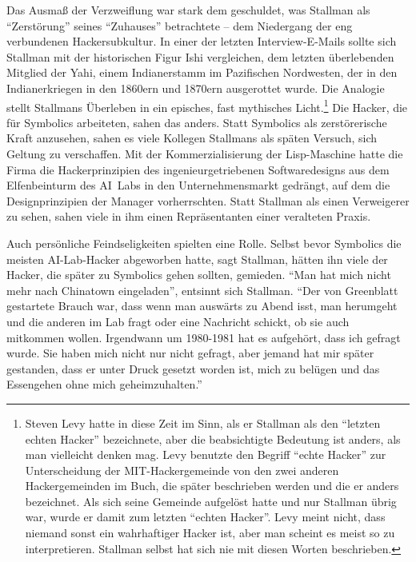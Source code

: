 Das Ausmaß der Verzweiflung war stark dem geschuldet, was Stallman als "`Zerstörung"' seines "`Zuhauses"' betrachtete – dem Niedergang der eng verbundenen Hackersubkultur. In einer der letzten Interview-E-Mails sollte sich Stallman mit der historischen Figur Ishi vergleichen, dem letzten überlebenden Mitglied der Yahi, einem Indianerstamm im Pazifischen Nordwesten, der in den Indianerkriegen in den 1860ern und 1870ern ausgerottet wurde. Die Analogie stellt Stallmans Überleben in ein episches, fast mythisches Licht.\footnote{Steven Levy hatte in  diese Zeit im Sinn, als er Stallman als den "`letzten echten Hacker"' bezeichnete, aber die beabsichtigte Bedeutung ist anders, als man vielleicht denken mag. Levy benutzte den Begriff "`echte Hacker"' zur Unterscheidung der MIT-Hackergemeinde von den zwei anderen Hackergemeinden im Buch, die später beschrieben werden und die er anders bezeichnet. Als sich seine Gemeinde aufgelöst hatte und nur Stallman übrig war, wurde er damit zum letzten "`echten Hacker"'. Levy meint nicht, dass niemand sonst ein wahrhaftiger Hacker ist, aber man scheint es meist so zu interpretieren. Stallman selbst hat sich nie mit diesen Worten beschrieben.} Die Hacker, die für Symbolics arbeiteten, sahen das anders. Statt Symbolics als zerstörerische Kraft anzusehen, sahen es viele Kollegen Stallmans als späten Versuch, sich Geltung zu verschaffen. Mit der Kommerzialisierung der Lisp-Maschine hatte die Firma die Hackerprinzipien des ingenieurgetriebenen Softwaredesigns aus dem Elfenbeinturm des AI~Labs in den Unternehmensmarkt gedrängt, auf dem die Designprinzipien der Manager vorherrschten. Statt Stallman als einen Verweigerer zu sehen, sahen viele in ihm einen Repräsentanten einer veralteten Praxis.

Auch persönliche Feindseligkeiten spielten eine Rolle. Selbst bevor Symbolics die meisten AI-Lab-Hacker abgeworben hatte, sagt Stallman, hätten ihn viele der Hacker, die später zu Symbolics gehen sollten, gemieden. "`Man hat mich nicht mehr nach Chinatown eingeladen"', entsinnt sich Stallman. "`Der von Greenblatt gestartete Brauch war, dass wenn man auswärts zu Abend isst, man herumgeht und die anderen im Lab fragt oder eine Nachricht schickt, ob sie auch mitkommen wollen. Irgendwann um 1980-1981 hat es aufgehört, dass ich gefragt wurde. Sie haben mich nicht nur nicht gefragt, aber jemand hat mir später gestanden, dass er unter Druck gesetzt worden ist, mich zu belügen und das Essengehen ohne mich geheimzuhalten."'

